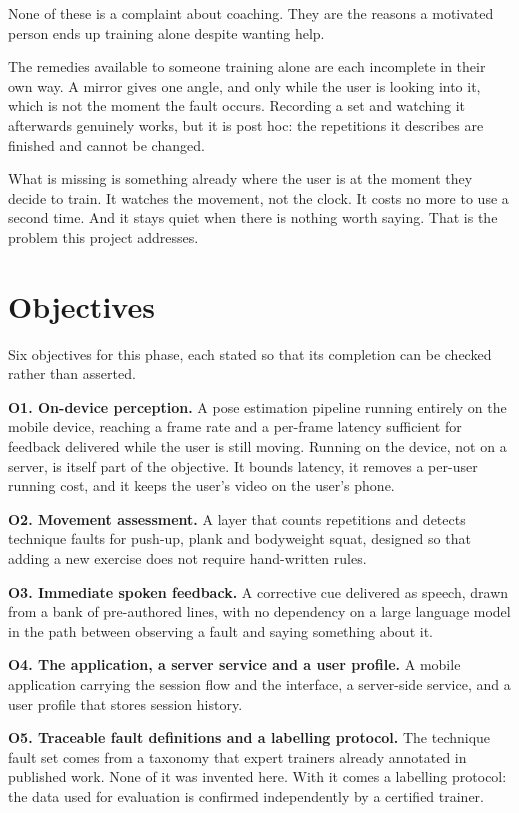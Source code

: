 None of these is a complaint about coaching. They are the reasons a motivated person ends up training alone despite wanting help.

The remedies available to someone training alone are each incomplete in their own way. A mirror gives one angle, and only while the user is looking into it, which is not the moment the fault occurs. Recording a set and watching it afterwards genuinely works, but it is post hoc: the repetitions it describes are finished and cannot be changed.

What is missing is something already where the user is at the moment they decide to train. It watches the movement, not the clock. It costs no more to use a second time. And it stays quiet when there is nothing worth saying. That is the problem this project addresses.

\section{Objectives}
\label{sec:1.3}

Six objectives for this phase, each stated so that its completion can be checked rather than asserted.

\textbf{O1. On-device perception.} A pose estimation pipeline running entirely on the mobile device, reaching a frame rate and a per-frame latency sufficient for feedback delivered while the user is still moving. Running on the device, not on a server, is itself part of the objective. It bounds latency, it removes a per-user running cost, and it keeps the user's video on the user's phone.

\textbf{O2. Movement assessment.} A layer that counts repetitions and detects technique faults for push-up, plank and bodyweight squat, designed so that adding a new exercise does not require hand-written rules.

\textbf{O3. Immediate spoken feedback.} A corrective cue delivered as speech, drawn from a bank of pre-authored lines, with no dependency on a large language model in the path between observing a fault and saying something about it.

\textbf{O4. The application, a server service and a user profile.} A mobile application carrying the session flow and the interface, a server-side service, and a user profile that stores session history.

\textbf{O5. Traceable fault definitions and a labelling protocol.} The technique fault set comes from a taxonomy that expert trainers already annotated in published work. None of it was invented here. With it comes a labelling protocol: the data used for evaluation is confirmed independently by a certified trainer.

